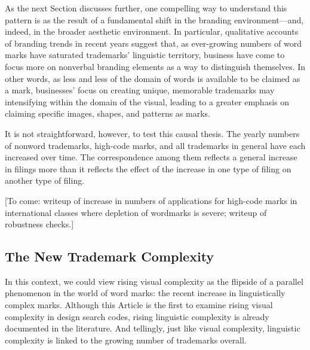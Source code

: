\documentclass[letterpaper, 11pt, oneside]{article}
\begin{document}
As the next Section discusses further, one compelling way to understand this pattern is as the result of a fundamental shift in the branding environment—and, indeed, in the broader aesthetic environment. In particular, qualitative accounts of branding trends in recent years suggest that, as ever-growing numbers of word marks have saturated trademarks' linguistic territory, business have come to focus more on nonverbal branding elements as a way to distinguish themselves. In other words, as less and less of the domain of words is available to be claimed as a mark, businesses' focus on creating unique, memorable trademarks may intensifying within the domain of the visual, leading to a greater emphasis on claiming specific images, shapes, and patterns as marks.

It is not straightforward, however, to test this causal thesis. The yearly numbers of nonword trademarks, high-code marks, and all trademarks in general have each increased over time. The correspondence among them reflects a general increase in filings more than it reflects the effect of the increase in one type of filing on another type of filing.

[To come: writeup of increase in numbers of applications for high-code marks in international classes where depletion of wordmarks is severe; writeup of robustness checks.]

\subsection{The New Trademark Complexity}\label{subsec:2C}

In this context, we could view rising visual complexity as the flipside of a parallel phenomenon in the world of word marks: the recent increase in linguistically complex marks. Although this Article is the first to examine rising visual complexity in design search codes, rising linguistic complexity is already documented in the literature. And tellingly, just like visual complexity, linguistic complexity is linked to the growing number of trademarks overall.
\end{document}
